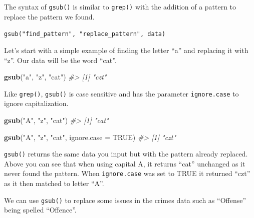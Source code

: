 \documentclass[
  12pt,
]{book}
\newenvironment{Shaded}{\begin{snugshade}}{\end{snugshade}}
\newcommand{\CommentTok}[1]{\textcolor[rgb]{0.56,0.35,0.01}{\textit{#1}}}
\newcommand{\DataTypeTok}[1]{\textcolor[rgb]{0.13,0.29,0.53}{#1}}
\newcommand{\KeywordTok}[1]{\textcolor[rgb]{0.13,0.29,0.53}{\textbf{#1}}}
\newcommand{\NormalTok}[1]{#1}
\newcommand{\OtherTok}[1]{\textcolor[rgb]{0.56,0.35,0.01}{#1}}
\newcommand{\StringTok}[1]{\textcolor[rgb]{0.31,0.60,0.02}{#1}}
\begin{document}
The syntax of \texttt{gsub()} is similar to \texttt{grep()} with the addition of a pattern to replace the pattern we found.

\texttt{gsub("find\_pattern",\ "replace\_pattern",\ data)}

Let's start with a simple example of finding the letter ``a'' and replacing it with ``z''. Our data will be the word ``cat''.

\begin{Shaded}
\begin{Highlighting}[]
\KeywordTok{gsub}\NormalTok{(}\StringTok{"a"}\NormalTok{, }\StringTok{"z"}\NormalTok{, }\StringTok{"cat"}\NormalTok{)}
\CommentTok{\#> [1] "czt"}
\end{Highlighting}
\end{Shaded}

Like \texttt{grep()}, \texttt{gsub()} is case sensitive and has the parameter \texttt{ignore.case} to ignore capitalization.

\begin{Shaded}
\begin{Highlighting}[]
\KeywordTok{gsub}\NormalTok{(}\StringTok{"A"}\NormalTok{, }\StringTok{"z"}\NormalTok{, }\StringTok{"cat"}\NormalTok{)}
\CommentTok{\#> [1] "cat"}
\end{Highlighting}
\end{Shaded}

\begin{Shaded}
\begin{Highlighting}[]
\KeywordTok{gsub}\NormalTok{(}\StringTok{"A"}\NormalTok{, }\StringTok{"z"}\NormalTok{, }\StringTok{"cat"}\NormalTok{, }\DataTypeTok{ignore.case =} \OtherTok{TRUE}\NormalTok{)}
\CommentTok{\#> [1] "czt"}
\end{Highlighting}
\end{Shaded}

\texttt{gsub()} returns the same data you input but with the pattern already replaced. Above you can see that when using capital A, it returns ``cat'' unchanged as it never found the pattern. When \texttt{ignore.case} was set to TRUE it returned ``czt'' as it then matched to letter ``A''.

We can use \texttt{gsub()} to replace some issues in the crimes data such as ``Offense'' being spelled ``Offence''.
\end{document}
